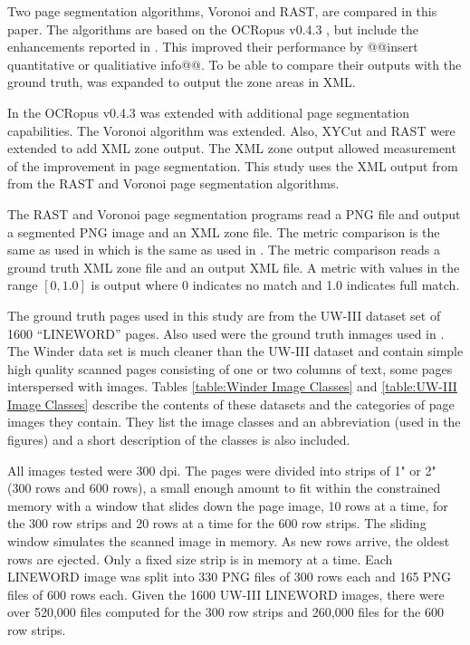 \documentclass[conference]{IEEEtran}
\begin{document}

Two page segmentation algorithms, Voronoi and RAST, are compared in this paper.
The algorithms are based on the OCRopus v0.4.3  \cite{breuel2008ocropus}, but
include the enhancements reported in \cite{winder2011icdar}. This improved
their performance by @@insert quantitative or qualitiative info@@.  To be able
to compare their outputs with the ground truth, \cite{breuel2008ocropus} was
expanded to output the zone areas in XML.

In \cite{winder2010extending} the OCRopus v0.4.3 was extended with
additional page segmentation capabilities. The Voronoi algorithm was extended.
Also, XYCut and RAST were extended to add XML zone output. The XML zone output
allowed measurement of the improvement in page segmentation.  This study uses
the XML output from \cite{winder2010extending} from the RAST and Voronoi page
segmentation algorithms. 

The RAST and Voronoi page segmentation programs read a PNG file and output a
segmented PNG image and an XML zone file. The metric comparison is the same as
used in \cite{winder2010extending} which is the same as used in
\cite{mao2000pset}\cite{antonacopoulos2007page}. The metric comparison
reads a ground truth XML zone file and an output XML file. A metric with values
in the range $[0, 1.0]$ is output where 0 indicates no match and 1.0 indicates
full match. 

The ground truth pages used in this study are from the UW-III dataset set of
1600 “LINEWORD” pages. Also used were the ground truth inmages used in \cite{winder2010extending}.
The Winder data set is much cleaner than the UW-III dataset
and contain simple high quality scanned pages consisting of one or two
columns of text, some pages interspersed with images. Tables \ref{table:Winder Image Classes} 
and \ref{table:UW-III Image Classes} describe the contents of these datasets
and the categories of page images they contain.  They list the image classes 
and an abbreviation (used in the figures) and a short description of the
classes is also included.

All images tested were 300 dpi.  The pages were divided into strips of 1" or 2" (300 rows and 600 rows),
a small enough amount to fit within the constrained memory with 
a window that slides down the page image, 10 rows at a time, for the 300
row strips and 20 rows at a time for the 600 row strips.  
The sliding window simulates the scanned image in memory. As new rows arrive, the
oldest rows are ejected. 
Only a fixed size strip is in memory at a time. Each
LINEWORD image was split into 330 PNG files of 300 rows each and 165 PNG files
of 600 rows each.  Given the 1600 UW-III LINEWORD images, there were over
520,000 files computed for the 300 row strips and 260,000 files for the 600 row
strips.
\end{document}
